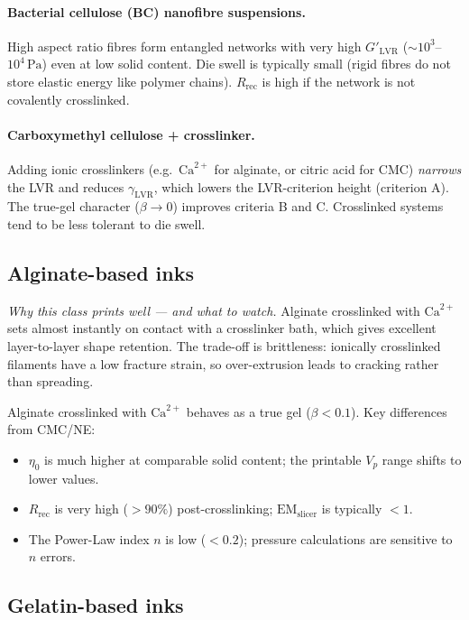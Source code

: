 \documentclass[11pt,a4paper]{article}
\begin{document}
\paragraph{Bacterial cellulose (BC) nanofibre suspensions.} High aspect
ratio fibres form entangled networks with very high $G'_\mathrm{LVR}$
($\sim 10^3$--$10^4\,\si{\Pa}$) even at low solid content. Die swell
is typically small (rigid fibres do not store elastic energy like polymer
chains). $R_\mathrm{rec}$ is high if the network is not covalently
crosslinked.

\paragraph{Carboxymethyl cellulose + crosslinker.} Adding ionic
crosslinkers (e.g.\ $\mathrm{Ca}^{2+}$ for alginate, or citric acid
for CMC) \emph{narrows} the LVR and reduces $\gamma_\mathrm{LVR}$, which
lowers the LVR-criterion height (criterion A). The true-gel character
($\beta\to 0$) improves criteria B and C. Crosslinked systems tend to
be less tolerant to die swell.

\subsection{Alginate-based inks}

\emph{Why this class prints well — and what to watch.}
Alginate crosslinked with $\mathrm{Ca}^{2+}$ sets almost instantly on
contact with a crosslinker bath, which gives excellent layer-to-layer
shape retention.  The trade-off is brittleness: ionically crosslinked
filaments have a low fracture strain, so over-extrusion leads to
cracking rather than spreading.

Alginate crosslinked with $\mathrm{Ca}^{2+}$ behaves as a true gel
($\beta<0.1$). Key differences from CMC/NE:
\begin{itemize}[leftmargin=1.6em,itemsep=2pt]
\item $\eta_0$ is much higher at comparable solid content; the
  printable $V_p$ range shifts to lower values.
\item $R_\mathrm{rec}$ is very high ($>90\%$) post-crosslinking;
  $\mathrm{EM}_\mathrm{slicer}$ is typically $<1$.
\item The Power-Law index $n$ is low ($<0.2$); pressure calculations
  are sensitive to $n$ errors.
\end{itemize}

\subsection{Gelatin-based inks}
\end{document}
